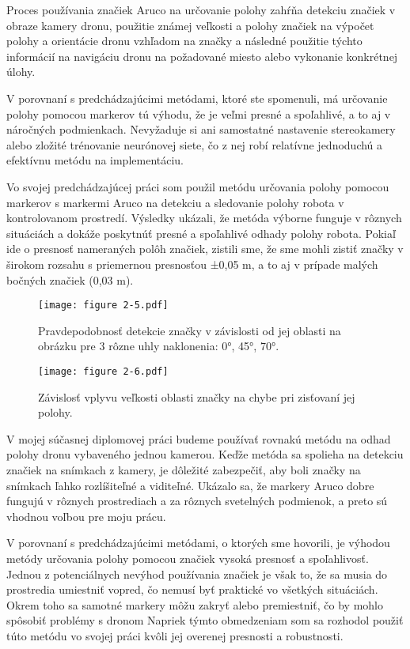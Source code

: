 Proces používania značiek Aruco na určovanie polohy zahŕňa detekciu značiek v obraze kamery dronu, použitie známej veľkosti a polohy značiek na výpočet polohy a orientácie dronu vzhľadom na značky a následné použitie týchto informácií na navigáciu dronu na požadované miesto alebo vykonanie konkrétnej úlohy.

V porovnaní s predchádzajúcimi metódami, ktoré ste spomenuli, má určovanie polohy pomocou markerov tú výhodu, že je veľmi presné a spoľahlivé, a to aj v náročných podmienkach. Nevyžaduje si ani samostatné nastavenie stereokamery alebo zložité trénovanie neurónovej siete, čo z nej robí relatívne jednoduchú a efektívnu metódu na implementáciu. 

Vo svojej predchádzajúcej práci som použil metódu určovania polohy pomocou markerov s markermi Aruco na detekciu a sledovanie polohy robota v kontrolovanom prostredí. Výsledky ukázali, že metóda výborne funguje v rôznych situáciách a dokáže poskytnúť presné a spoľahlivé odhady polohy robota. Pokiaľ ide o presnosť nameraných polôh značiek, zistili sme, že sme mohli zistiť značky v širokom rozsahu s priemernou presnosťou ±0,05 m, a to aj v prípade malých bočných značiek (0,03 m). 

\begin{figure}[ht!]
    \centering
    \texttt{[image: figure 2-5.pdf]}
    \caption{Pravdepodobnosť detekcie značky v závislosti od jej oblasti na obrázku pre 3 rôzne uhly naklonenia: 0°, 45°, 70°.}
    \label{o:2-5}
\end{figure}

\begin{figure}[ht!]
    \centering
    \texttt{[image: figure 2-6.pdf]}
    \caption{Závislosť vplyvu veľkosti oblasti značky na chybe pri zisťovaní jej polohy.}
    \label{o:2-6}
\end{figure}

V mojej súčasnej diplomovej práci budeme používať rovnakú metódu na odhad polohy dronu vybaveného jednou kamerou. Keďže metóda sa spolieha na detekciu značiek na snímkach z kamery, je dôležité zabezpečiť, aby boli značky na snímkach ľahko rozlíšiteľné a viditeľné. Ukázalo sa, že markery Aruco dobre fungujú v rôznych prostrediach a za rôznych svetelných podmienok, a preto sú vhodnou voľbou pre moju prácu.

\newpage
V porovnaní s predchádzajúcimi metódami, o ktorých sme hovorili, je výhodou metódy určovania polohy pomocou značiek vysoká presnosť a spoľahlivosť. Jednou z potenciálnych nevýhod používania značiek je však to, že sa musia do prostredia umiestniť vopred, čo nemusí byť praktické vo všetkých situáciách. Okrem toho sa samotné markery môžu zakryť alebo premiestniť, čo by mohlo spôsobiť problémy s dronom Napriek týmto obmedzeniam som sa rozhodol použiť túto metódu vo svojej práci kvôli jej overenej presnosti a robustnosti.

